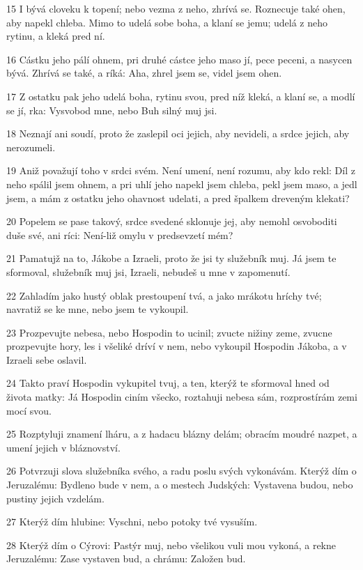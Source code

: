 \par 15 I bývá cloveku k topení; nebo vezma z neho, zhrívá se. Roznecuje také ohen, aby napekl chleba. Mimo to udelá sobe boha, a klaní se jemu; udelá z neho rytinu, a kleká pred ní.
\par 16 Cástku jeho pálí ohnem, pri druhé cástce jeho maso jí, pece peceni, a nasycen bývá. Zhrívá se také, a ríká: Aha, zhrel jsem se, videl jsem ohen.
\par 17 Z ostatku pak jeho udelá boha, rytinu svou, pred níž kleká, a klaní se, a modlí se jí, rka: Vysvobod mne, nebo Buh silný muj jsi.
\par 18 Neznají ani soudí, proto že zaslepil oci jejich, aby nevideli, a srdce jejich, aby nerozumeli.
\par 19 Aniž považují toho v srdci svém. Není umení, není rozumu, aby kdo rekl: Díl z neho spálil jsem ohnem, a pri uhlí jeho napekl jsem chleba, pekl jsem maso, a jedl jsem, a mám z ostatku jeho ohavnost udelati, a pred špalkem dreveným klekati?
\par 20 Popelem se pase takový, srdce svedené sklonuje jej, aby nemohl osvoboditi duše své, ani ríci: Není-liž omylu v predsevzetí mém?
\par 21 Pamatujž na to, Jákobe a Izraeli, proto že jsi ty služebník muj. Já jsem te sformoval, služebník muj jsi, Izraeli, nebudeš u mne v zapomenutí.
\par 22 Zahladím jako hustý oblak prestoupení tvá, a jako mrákotu hríchy tvé; navratiž se ke mne, nebo jsem te vykoupil.
\par 23 Prozpevujte nebesa, nebo Hospodin to ucinil; zvucte nižiny zeme, zvucne prozpevujte hory, les i všeliké dríví v nem, nebo vykoupil Hospodin Jákoba, a v Izraeli sebe oslavil.
\par 24 Takto praví Hospodin vykupitel tvuj, a ten, kterýž te sformoval hned od života matky: Já Hospodin ciním všecko, roztahuji nebesa sám, rozprostírám zemi mocí svou.
\par 25 Rozptyluji znamení lháru, a z hadacu blázny delám; obracím moudré nazpet, a umení jejich v bláznovství.
\par 26 Potvrzuji slova služebníka svého, a radu poslu svých vykonávám. Kterýž dím o Jeruzalému: Bydleno bude v nem, a o mestech Judských: Vystavena budou, nebo pustiny jejich vzdelám.
\par 27 Kterýž dím hlubine: Vyschni, nebo potoky tvé vysuším.
\par 28 Kterýž dím o Cýrovi: Pastýr muj, nebo všelikou vuli mou vykoná, a rekne Jeruzalému: Zase vystaven bud, a chrámu: Založen bud.

